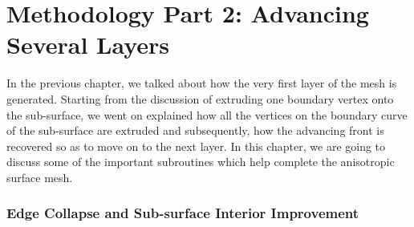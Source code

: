 \chapter{Methodology Part 2: Advancing Several Layers}

In the previous chapter, we talked about how the very first layer of the mesh is generated. Starting from the discussion of extruding one boundary vertex onto the sub-surface, we went on explained how all the vertices on the boundary curve of the sub-surface are extruded and subsequently, how the advancing front is recovered so as to move on to the next layer. In this chapter, we are going to discuss some of the important subroutines which help complete the anisotropic surface mesh.

\subsection{Edge Collapse and Sub-surface Interior Improvement}

